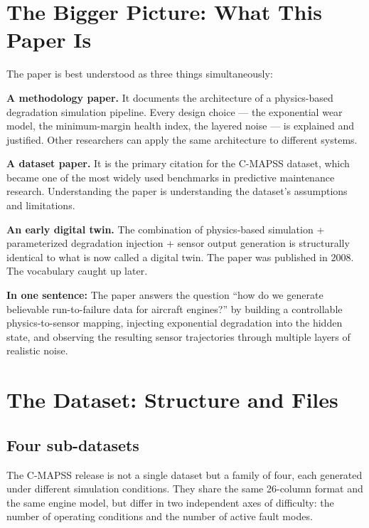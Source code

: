 \documentclass[11pt, a4paper]{article}
\begin{document}
\section{The Bigger Picture: What This Paper Is}

The paper is best understood as three things simultaneously:

\textbf{A methodology paper.} It documents the architecture of a
physics-based degradation simulation pipeline. Every design choice ---
the exponential wear model, the minimum-margin health index, the
layered noise --- is explained and justified. Other researchers can
apply the same architecture to different systems.

\textbf{A dataset paper.} It is the primary citation for the C-MAPSS
dataset, which became one of the most widely used benchmarks in
predictive maintenance research. Understanding the paper is
understanding the dataset's assumptions and limitations.

\textbf{An early digital twin.} The combination of physics-based
simulation + parameterized degradation injection + sensor output
generation is structurally identical to what is now called a
digital twin. The paper was published in 2008. The vocabulary
caught up later.

\begin{keybox}
\textbf{In one sentence:}
The paper answers the question ``how do we generate believable
run-to-failure data for aircraft engines?'' by building a
controllable physics-to-sensor mapping, injecting exponential
degradation into the hidden state, and observing the resulting
sensor trajectories through multiple layers of realistic noise.
\end{keybox}

\section{The Dataset: Structure and Files}

\subsection{Four sub-datasets}

The C-MAPSS release is not a single dataset but a family of four,
each generated under different simulation conditions. They share the
same 26-column format and the same engine model, but differ in two
independent axes of difficulty: the number of operating conditions
and the number of active fault modes.
\end{document}
